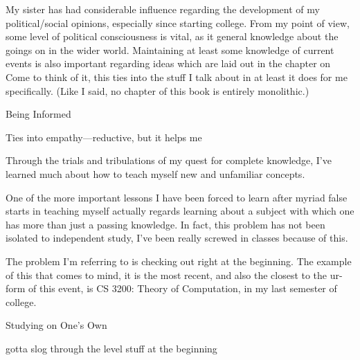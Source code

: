 \documentclass[../butidigress.tex]{subfiles}
\begin{document}
My sister has had considerable influence regarding the development of my political/social opinions, especially since starting college.
From my point of view, some level of political consciousness is vital, as it general knowledge about the goings on in the wider world.
Maintaining at least some knowledge of current events is also important regarding ideas which are laid out in the chapter on 
Come to think of it, this ties into the stuff I talk about in  at least it does for me specifically.
(Like I said, no chapter of this book is entirely monolithic.)

\begin{somenotes}{Being Informed}
    \item Ties into empathy---reductive, but it helps me 
\end{somenotes}

Through the trials and tribulations of my quest for complete knowledge, I've learned much about how to teach myself new and unfamiliar concepts.


\entryskip

One of the more important lessons I have been forced to learn after myriad false starts in teaching myself actually regards learning about a subject with which one has more than just a passing knowledge.
In fact, this problem has not been isolated to independent study, I've been really screwed in classes because of this.

The problem I'm referring to is checking out right at the beginning.
The example of this that comes to mind, it is the most recent, and also the closest to the ur-form of this event, is CS 3200: Theory of Computation, in my last semester of college.

\begin{somenotes}{Studying on One's Own}
    \item gotta slog through the  level stuff at the beginning
\end{somenotes}
\end{document}
